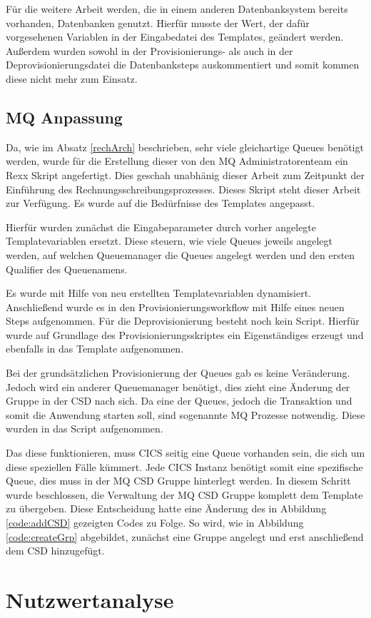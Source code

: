 Für die weitere Arbeit werden, die in einem anderen Datenbanksystem bereits vorhanden, Datenbanken genutzt.
Hierfür musste der Wert, der dafür vorgesehenen Variablen in der Eingabedatei des Templates, geändert werden.
Außerdem wurden sowohl in der Provisionierungs- als auch in der Deprovisionierungsdatei die Datenbanksteps auskommentiert und somit kommen diese nicht mehr zum Einsatz.

\subsection{MQ Anpassung}\label{ssec:mqentw}
Da, wie im Absatz \ref{rechArch} beschrieben, sehr viele gleichartige Queues benötigt werden, wurde für die Erstellung dieser von den MQ Administratorenteam ein Rexx Skript angefertigt.
Dies geschah unabhänig dieser Arbeit zum Zeitpunkt der Einführung des Rechnungsschreibungsprozesses.
Dieses Skript steht dieser Arbeit zur Verfügung.
Es wurde auf die Bedürfnisse des Templates angepasst.

Hierfür wurden zunächst die Eingabeparameter durch vorher angelegte Templatevariablen ersetzt.
Diese steuern, wie viele Queues jeweils angelegt werden, auf welchen Queuemanager die Queues angelegt werden und den ersten Qualifier des Queuenamens.


Es wurde mit Hilfe von neu erstellten Templatevariablen dynamisiert.
Anschließend wurde es in den Provisionierungsworkflow mit Hilfe eines neuen Steps aufgenommen.
Für die Deprovisionierung besteht noch kein Script.
Hierfür wurde auf Grundlage des Provisionierungsskriptes ein Eigenständiges erzeugt und ebenfalls in das Template aufgenommen.

Bei der grundsätzlichen Provisionierung der Queues gab es keine Veränderung.
Jedoch wird ein anderer Queuemanager benötigt, dies zieht eine Änderung der Gruppe in der CSD nach sich.
Da eine der Queues, jedoch die Transaktion und somit die Anwendung starten soll, sind sogenannte MQ Prozesse notwendig.
Diese wurden in das Script aufgenommen.

Das diese funktionieren, muss CICS seitig eine Queue vorhanden sein, die sich um diese speziellen Fälle kümmert.
Jede CICS Instanz benötigt somit eine spezifische Queue, dies muss in der MQ CSD Gruppe hinterlegt werden.
In diesem Schritt wurde beschlossen, die Verwaltung der MQ CSD Gruppe komplett dem Template zu übergeben.
Diese Entscheidung hatte eine Änderung des in Abbildung \ref{code:addCSD} gezeigten Codes zu Folge.
So wird, wie in Abbildung \ref{code:createGrp} abgebildet, zunächst eine Gruppe angelegt und erst anschließend dem CSD hinzugefügt.

\section{Nutzwertanalyse}
